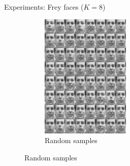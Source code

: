 \documentclass[unicode,11pt]{beamer}
\begin{document}
\begin{frame}[fragile]{Experiments: Frey faces ($K = 8$)}
\begin{figure}
\begin{subfigure}[b]{.4\linewidth}
      \includegraphics[width=.8\linewidth]{images/nf_frey_B400_E8000_N560_L2_H200_F8_C_sample_64}
      \caption{Random samples}
    \end{subfigure}
  \end{figure}
\end{frame}
\end{document}
